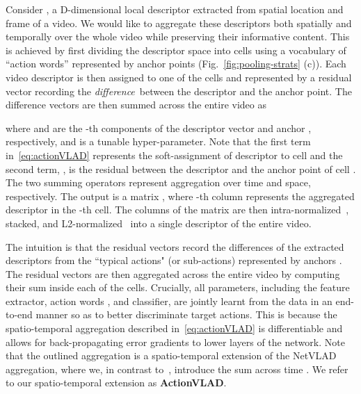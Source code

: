 \documentclass[10pt,twocolumn,letterpaper]{article}
\newcommand{\methodTag}[0]{ActionVLAD}
\begin{document}
Consider , a D-dimensional local descriptor extracted from spatial location  and frame  of a video. We would like to aggregate these descriptors both spatially and temporally over the whole video while preserving their informative content.
This is achieved by first dividing the descriptor space  into  cells using a vocabulary of  ``action words'' represented by anchor points  (Fig.~\ref{fig:pooling-strats} (c)).
Each video descriptor  is then assigned to one of the cells and represented by a residual vector   recording the {\em difference}\ between the descriptor and the anchor point.
The difference vectors are then summed across the entire video as

where  and  are the -th components of the descriptor vector  and anchor , respectively, and  is a tunable hyper-parameter. Note that the first term in~\eqref{eq:actionVLAD} represents the soft-assignment of descriptor  to cell  and the second term, , is the residual between the descriptor and the anchor point of cell . The two summing operators represent aggregation over time and space, respectively. The output is a matrix , where -th column  represents the aggregated descriptor in the -th cell. The columns of the matrix are then intra-normalized~\cite{Arandjelovic13}, stacked, and L2-normalized~\cite{Jegou_10_VLAD} into a single descriptor  of the entire video.

The intuition is that the residual vectors record the differences of the extracted descriptors from the ``typical actions" (or sub-actions) represented by anchors . The residual vectors are then aggregated across the entire video by computing their sum inside each of the cells. Crucially, all parameters, including the feature extractor, action words , and classifier, are jointly learnt from the data in an end-to-end manner so as to better discriminate target actions. This is because the spatio-temporal aggregation described in~\eqref{eq:actionVLAD} is differentiable and allows for back-propagating error gradients to lower layers of the network. 
Note that the outlined aggregation is a spatio-temporal extension of the NetVLAD~\cite{Arandjelovic16} aggregation, where we, in contrast to~\cite{Arandjelovic16}, introduce the sum across time . We refer to our spatio-temporal extension as {\bf \methodTag{}}.
\end{document}
